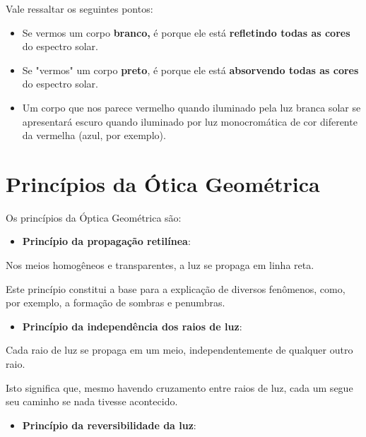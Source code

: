 \documentclass[11pt,twocolumn,oneside]{article}
\begin{document}
Vale ressaltar os seguintes pontos:


\begin{itemize}

\item Se vermos um corpo \textbf{branco,} é porque ele está \textbf{refletindo todas as cores} do espectro solar.

\item Se "vermos" um corpo \textbf{preto}, é porque ele está \textbf{absorvendo todas as cores} do espectro solar.

\item Um corpo que nos parece vermelho quando iluminado pela luz branca solar se apresentará escuro quando iluminado por luz monocromática de cor diferente da vermelha (azul, por exemplo).

\end{itemize}


\hypertarget{x-princípios-da-ótica-geométrica}{\section{Princípios da Ótica Geométrica}}
Os princípios da Óptica Geométrica são:


\begin{itemize}

\item \textbf{Princípio da propagação retilínea}:

\end{itemize}


Nos meios homogêneos e transparentes, a luz se propaga em linha reta.


Este princípio constitui a base para a explicação de diversos fenômenos, como, por exemplo, a formação de sombras e penumbras.


\begin{itemize}

\item \textbf{Princípio da independência dos raios de luz}:

\end{itemize}


Cada raio de luz se propaga em um meio, independentemente de qualquer outro raio.


Isto significa que, mesmo havendo cruzamento entre raios de luz, cada um segue seu caminho se nada tivesse acontecido.


\begin{itemize}

\item \textbf{Princípio da reversibilidade da luz}:

\end{itemize}
\end{document}
